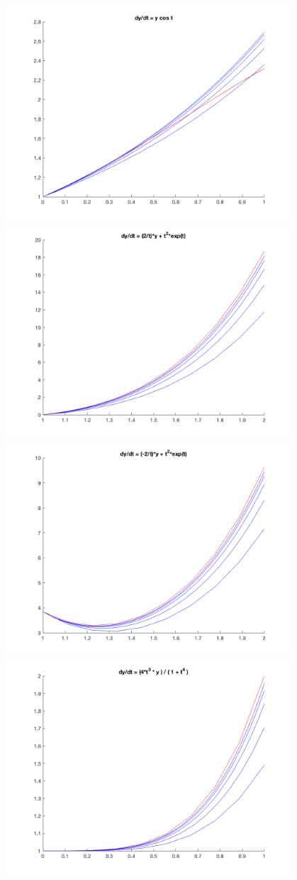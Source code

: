 \documentclass{article}
\begin{document}
\includegraphics[height=8cm]{parta_1}\\
\includegraphics[height=8cm]{parta_2}\\
\includegraphics[height=8cm]{parta_3}\\
\includegraphics[height=8cm]{parta_4}\\
\end{document}
